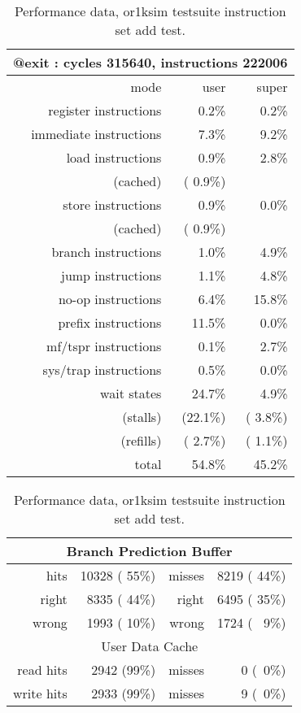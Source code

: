 \documentclass[conference]{IEEEtran}
\begin{document}
\begin{table}[!t]
\renewcommand{\arraystretch}{1.3}
\caption{Performance data, or1ksim testsuite instruction set add test.}
\label{t:1}
\centering
\begin{tabular}{|r||r|r|}
\hline
\multicolumn{3}{|l|}{@exit  : cycles 315640, instructions 222006}\\
\hline
\hline
            mode  &user        &super     \\
\hline
 register  instructions  & 0.2\%      &  0.2\%   \\
 immediate instructions  & 7.3\%      &  9.2\%   \\
 load      instructions  & 0.9\%      &  2.8\%   \\[-1ex]
          (cached)& ( 0.9\%)   &          \\
 store     instructions  & 0.9\%      &  0.0\%   \\[-1ex]
          (cached)& ( 0.9\%)   &          \\
 branch    instructions  & 1.0\%      &  4.9\%   \\
 jump      instructions  & 1.1\%      &  4.8\%   \\
 no-op     instructions  & 6.4\%      & 15.8\%   \\
 prefix    instructions  &11.5\%      &  0.0\%   \\
 mf/tspr   instructions  & 0.1\%      &  2.7\%   \\
 sys/trap  instructions  & 0.5\%      &  0.0\%   \\
 wait     states  &24.7\%      &  4.9\%   \\[-1ex]
          (stalls)& (22.1\%)   &  ( 3.8\%)\\[-1ex]
         (refills)& ( 2.7\%)   &  ( 1.1\%)\\
\hline
           total  &54.8\%      & 45.2\%   \\
\hline
\end{tabular}

\medskip
\begin{tabular}{|r|r||r|r|}
\hline
\multicolumn{4}{|c|}{Branch Prediction Buffer}       \\
\hline
      hits   &10328     ( 55\%)& misses   &8219  ( 44\%) \\
\hline
      right  &8335      ( 44\%)& right    &6495  ( 35\%) \\
      wrong  &1993      ( 10\%)& wrong    &1724  ( ~9\%) \\
\hline
\hline
\multicolumn{4}{|c|}{User Data Cache}    \\
\hline
read  hits &2942 (99\%)& misses &0 (~0\%)   \\
write hits &2933 (99\%)& misses &9 (~0\%)   \\
\hline
\end{tabular}
\end{table}
\end{document}
